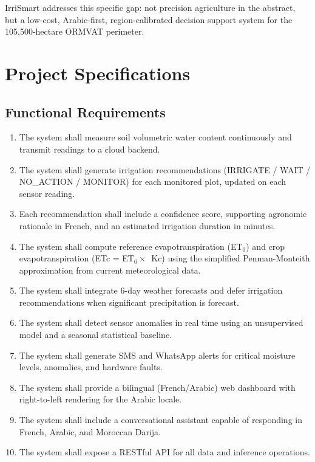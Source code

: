 \documentclass[12pt,a4paper]{report}
\begin{document}
IrriSmart addresses this specific gap: not precision agriculture in the abstract, but a low-cost, Arabic-first, region-calibrated decision support system for the 105,500-hectare ORMVAT perimeter.

\chapter{Project Specifications}

\section{Functional Requirements}

\begin{enumerate}
  \item The system shall measure soil volumetric water content continuously and transmit readings to a cloud backend.
  \item The system shall generate irrigation recommendations (IRRIGATE / WAIT / NO\_ACTION / MONITOR) for each monitored plot, updated on each sensor reading.
  \item Each recommendation shall include a confidence score, supporting agronomic rationale in French, and an estimated irrigation duration in minutes.
  \item The system shall compute reference evapotranspiration (ET$_0$) and crop evapotranspiration (ETc = ET$_0 \times$~Kc) using the simplified Penman-Monteith approximation from current meteorological data.
  \item The system shall integrate 6-day weather forecasts and defer irrigation recommendations when significant precipitation is forecast.
  \item The system shall detect sensor anomalies in real time using an unsupervised model and a seasonal statistical baseline.
  \item The system shall generate SMS and WhatsApp alerts for critical moisture levels, anomalies, and hardware faults.
  \item The system shall provide a bilingual (French/Arabic) web dashboard with right-to-left rendering for the Arabic locale.
  \item The system shall include a conversational assistant capable of responding in French, Arabic, and Moroccan Darija.
  \item The system shall expose a RESTful API for all data and inference operations.
\end{enumerate}
\end{document}
